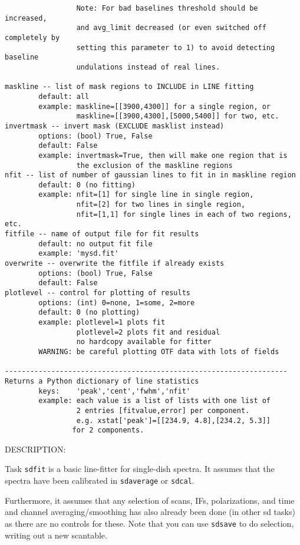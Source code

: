 \begin{verbatim}
                 Note: For bad baselines threshold should be increased,
                 and avg_limit decreased (or even switched off completely by
                 setting this parameter to 1) to avoid detecting baseline
                 undulations instead of real lines.
        
maskline -- list of mask regions to INCLUDE in LINE fitting
        default: all
        example: maskline=[[3900,4300]] for a single region, or
                 maskline=[[3900,4300],[5000,5400]] for two, etc.
invertmask -- invert mask (EXCLUDE masklist instead)
        options: (bool) True, False
        default: False
        example: invertmask=True, then will make one region that is
                 the exclusion of the maskline regions
nfit -- list of number of gaussian lines to fit in in maskline region
        default: 0 (no fitting)
        example: nfit=[1] for single line in single region,
                 nfit=[2] for two lines in single region,
                 nfit=[1,1] for single lines in each of two regions, etc.
fitfile -- name of output file for fit results
        default: no output fit file
        example: 'mysd.fit'
overwrite -- overwrite the fitfile if already exists
        options: (bool) True, False
        default: False
plotlevel -- control for plotting of results
        options: (int) 0=none, 1=some, 2=more
        default: 0 (no plotting)
        example: plotlevel=1 plots fit
                 plotlevel=2 plots fit and residual 
                 no hardcopy available for fitter
        WARNING: be careful plotting OTF data with lots of fields
        
-------------------------------------------------------------------
Returns a Python dictionary of line statistics
        keys:    'peak','cent','fwhm','nfit'
        example: each value is a list of lists with one list of
                 2 entries [fitvalue,error] per component.
                 e.g. xstat['peak']=[[234.9, 4.8],[234.2, 5.3]]
                for 2 components.
\end{verbatim}

    DESCRIPTION:

    Task {\tt sdfit} is a basic line-fitter for single-dish spectra.
    It assumes that the spectra have been calibrated in {\tt sdaverage}
    or {\tt sdcal}.

    Furthermore, it assumes that any selection of scans, IFs,
    polarizations, and time and channel averaging/smoothing has
    also already been done (in other sd tasks) as there are no controls
    for these.  Note that you can use {\tt sdsave} to do selection, writing
    out a new scantable.

